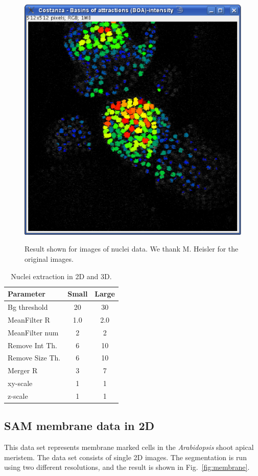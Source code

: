 \documentclass[a4paper,12pt]{article}
\begin{document}
\begin{figure}[h!]
\begin{center}
{\label{fig:43boas}\includegraphics[width=0.4\columnwidth]{figures1/boas.eps}
}
\caption{Result shown for images of nuclei data. We thank M. Heisler for the
	original images.}
\label{fig:43zoom}
\end{center}
\end{figure}


\begin{table}
	\begin{center}
		\begin{tabular}{|l|cc|}
			\hline
			Parameter & Small & Large\\
			\hline
			Bg threshold & 20 & 30\\
			MeanFilter R & 1.0 & 2.0\\
			MeanFilter num & 2 & 2\\
			Remove Int Th. & 6 & 10\\
			Remove Size Th. & 6 & 10\\
			Merger R & 3 & 7\\
			xy-scale & 1 & 1\\
			z-scale & 1 & 1\\
			\hline
		\end{tabular}
		\caption{Nuclei extraction in 2D and 3D.}
		\label{tab:43zoom}
	\end{center}
\end{table}

\subsection{SAM membrane data in 2D}


This data set represents membrane marked cells in the \textit{Arabidopsis}
shoot apical meristem. The data set consists of single 2D images. The
segmentation is run using two different resolutions, and the result is shown
in Fig.~\ref{fig:membrane}.
\end{document}
